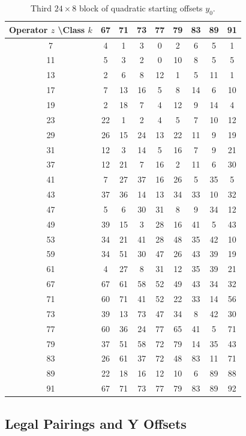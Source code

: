 \documentclass[11pt,a4paper]{article}
\begin{document}
\begin{table}[htbp]
\centering
\tiny
\begin{tabular}{c|cccccccc}
Operator \(z\) \textbackslash Class \(k\) & 67 & 71 & 73 & 77 & 79 & 83 & 89 & 91 \\
\hline
7  & 4 & 1 & 3 & 0 & 2 & 6 & 5 & 1 \\
11 & 5 & 3 & 2 & 0 & 10 & 8 & 5 & 5 \\
13 & 2 & 6 & 8 & 12 & 1 & 5 & 11 & 1 \\
17 & 7 & 13 & 16 & 5 & 8 & 14 & 6 & 10 \\
19 & 2 & 18 & 7 & 4 & 12 & 9 & 14 & 4 \\
23 & 22 & 1 & 2 & 4 & 5 & 7 & 10 & 12 \\
29 & 26 & 15 & 24 & 13 & 22 & 11 & 9 & 19 \\
31 & 12 & 3 & 14 & 5 & 16 & 7 & 9 & 21 \\
37 & 12 & 21 & 7 & 16 & 2 & 11 & 6 & 30 \\
41 & 7 & 27 & 37 & 16 & 26 & 5 & 35 & 5 \\
43 & 37 & 36 & 14 & 13 & 34 & 33 & 10 & 32 \\
47 & 5 & 6 & 30 & 31 & 8 & 9 & 34 & 12 \\
49 & 39 & 15 & 3 & 28 & 16 & 41 & 5 & 43 \\
53 & 34 & 21 & 41 & 28 & 48 & 35 & 42 & 10 \\
59 & 34 & 51 & 30 & 47 & 26 & 43 & 39 & 19 \\
61 & 4 & 27 & 8 & 31 & 12 & 35 & 39 & 21 \\
67 & 67 & 61 & 58 & 52 & 49 & 43 & 34 & 32 \\
71 & 60 & 71 & 41 & 52 & 22 & 33 & 14 & 56 \\
73 & 39 & 13 & 73 & 47 & 34 & 8 & 42 & 30 \\
77 & 60 & 36 & 24 & 77 & 65 & 41 & 5 & 71 \\
79 & 37 & 51 & 58 & 72 & 79 & 14 & 35 & 43 \\
83 & 26 & 61 & 37 & 72 & 48 & 83 & 11 & 71 \\
89 & 22 & 18 & 16 & 12 & 10 & 6 & 89 & 88 \\
91 & 67 & 71 & 73 & 77 & 79 & 83 & 89 & 92 \\
\end{tabular}
\caption{Third \(24 \times 8\) block of quadratic starting offsets \(y_0\).}
\label{tab:y0-block3}
\end{table}

\subsection{Legal Pairings and Y Offsets}
\end{document}
